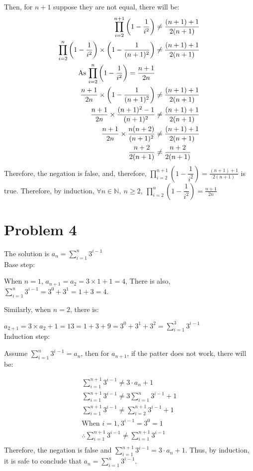 \documentclass{article}
\begin{document}
    Then, for \(n+1\) suppose they are not equal, there will be:
    \begin{align*}
        \prod ^{n+1}_{i=2}\left(1-\dfrac{1}{i^2}\right)&\neq \frac{(n+1)+1}{2(n+1)}\\
        \prod ^{n}_{i=2}\left(1-\dfrac{1}{i^2}\right)\times \left(1-\frac{1}{(n+1)^2}\right)&\neq \frac{(n+1)+1}{2(n+1)}\\
        \text{As  \( \prod ^n_{i=2}\left(1-\dfrac{1}{i^2}\right)=\frac{n+1}{2n}\)}\\
        \frac{n+1}{2n} \times \left(1-\frac{1}{(n+1)^2}\right)&\neq \frac{(n+1)+1}{2(n+1)}\\
        \frac{n+1}{2n}\times \frac{(n+1)^2-1}{(n+1)^2}&\neq \frac{(n+1)+1}{2(n+1)}\\
        \frac{n+1}{2n}\times \frac{n(n+2)}{(n+1)^2}&\neq \frac{(n+1)+1}{2(n+1)}\\
        \frac{n+2}{2(n+1)} &\neq \frac{n+2}{2(n+1)}
    \end{align*}    
    Therefore, the negation is false, and, therefore, \(\displaystyle{\prod ^{n+1}_{i=2}\left(1-\dfrac{1}{i^2}\right) = \frac{(n+1)+1}{2(n+1)}}\) is true.
    Therefore, by induction, \(\forall n\in \mathbb{N},\ n\geqslant2,\ \displaystyle {\prod ^n_{i=2}\left(1-\dfrac{1}{i^2}\right)=\frac{n+1}{2n}}\)
\newpage
\section*{Problem 4}
    The solution is \(\displaystyle{a_n =\sum ^{n}_{i=1} 3^{i-1}}\)\\
    Base step:

    When \(n=1\), \(a_{n+1}=a_2=3\times 1+1=4\), There is also, \(\displaystyle{\sum_{i=1}^{n} 3^{i-1}=3^0+3^1=1+3=4}\).
    
    Similarly, when \(n=2\), there is:

    \(a_{2+1}=3\times a_2+1=13 = 1+3+9= 3^0+3^1+3^2=\displaystyle {\sum ^3_{i=1}3^{i-1}}\)
    \\
    Induction step:

    Assume \(\displaystyle{\sum^n_{i=1}3^{i-1}=a_n}\), then for \(a_{n+1}\), if the patter does not work, there will be:


    \begin{align*}
        \sum^{n+1}_{i=1} 3^{i-1}\neq3\cdot a_n +1\\
        \sum^{n+1}_{i=1} 3^{i-1}\neq3\sum^{n}_{i=1} 3^{i-1}+1\\
        \sum^{n+1}_{i=1} 3^{i-1}\neq \sum^{n+1}_{i=2} 3^{i-1}+1\\
        \text{When } i =1\text{,} \   3^{i-1}=3^0=1\\
        \therefore \sum^{n+1}_{i=1} 3^{i-1}\neq \sum^{n+1}_{i=1} 3^{i-1}\\
    \end{align*}
    Therefore, the negation is false and \(\displaystyle{\sum^{n+1}_{i=1} 3^{i-1}=3\cdot a_n +1}\).
    Thus, by induction, it is safe to conclude that \(\displaystyle{a_n =\sum ^{n}_{i=1} 3^{i-1}}\).
\end{document}
